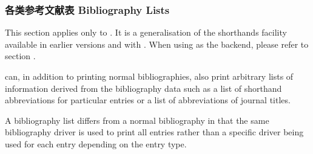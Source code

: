 \subsubsection{各类参考文献表 Bibliography Lists}
\label{use:bib:biblist}

\BiberOnlyMark This section applies only to \biber. It is a generalisation of the shorthands facility available in earlier versions and with \bibtex. When using \bibtex as the backend, please refer to section .

\biblatex can, in addition to printing normal bibliographies, also print arbitrary lists of information derived from the bibliography data such as a list of shorthand abbreviations for particular entries or a list of abbreviations of journal titles.

A bibliography list differs from a normal bibliography in that the same bibliography driver is used to print all entries rather than a specific driver being used for each entry depending on the entry type.

